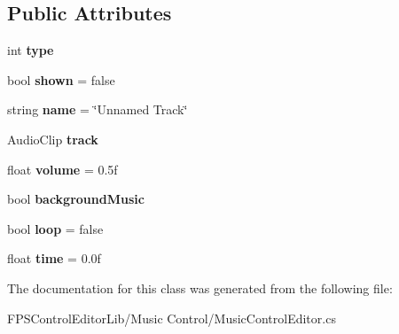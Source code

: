 \subsection*{Public Attributes}
\begin{DoxyCompactItemize}
\item 
\hypertarget{class_f_p_s_control_editor_1_1_node_af5dc9440907e8f9b055884e33a6498bb}{int {\bfseries type}}\label{class_f_p_s_control_editor_1_1_node_af5dc9440907e8f9b055884e33a6498bb}

\item 
\hypertarget{class_f_p_s_control_editor_1_1_node_a35d14bd77cfb906a119d432010929af8}{bool {\bfseries shown} = false}\label{class_f_p_s_control_editor_1_1_node_a35d14bd77cfb906a119d432010929af8}

\item 
\hypertarget{class_f_p_s_control_editor_1_1_node_ae3ea5c3b57c8b776ccd4e93af6aa18e6}{string {\bfseries name} = \char`\"{}Unnamed Track\char`\"{}}\label{class_f_p_s_control_editor_1_1_node_ae3ea5c3b57c8b776ccd4e93af6aa18e6}

\item 
\hypertarget{class_f_p_s_control_editor_1_1_node_ae22cab3f91ee42d6432e3883bf34ea52}{Audio\-Clip {\bfseries track}}\label{class_f_p_s_control_editor_1_1_node_ae22cab3f91ee42d6432e3883bf34ea52}

\item 
\hypertarget{class_f_p_s_control_editor_1_1_node_a70c7a7412244231bf2c49d4861e5c0b6}{float {\bfseries volume} = 0.\-5f}\label{class_f_p_s_control_editor_1_1_node_a70c7a7412244231bf2c49d4861e5c0b6}

\item 
\hypertarget{class_f_p_s_control_editor_1_1_node_a6c07ce33441965ffeee8945746b519d6}{bool {\bfseries background\-Music}}\label{class_f_p_s_control_editor_1_1_node_a6c07ce33441965ffeee8945746b519d6}

\item 
\hypertarget{class_f_p_s_control_editor_1_1_node_ad07e8306842d5b66207ed27b2766f331}{bool {\bfseries loop} = false}\label{class_f_p_s_control_editor_1_1_node_ad07e8306842d5b66207ed27b2766f331}

\item 
\hypertarget{class_f_p_s_control_editor_1_1_node_acd5b24eee53950110e4633afcaa977a0}{float {\bfseries time} = 0.\-0f}\label{class_f_p_s_control_editor_1_1_node_acd5b24eee53950110e4633afcaa977a0}

\end{DoxyCompactItemize}


The documentation for this class was generated from the following file\-:\begin{DoxyCompactItemize}
\item 
F\-P\-S\-Control\-Editor\-Lib/\-Music Control/Music\-Control\-Editor.\-cs\end{DoxyCompactItemize}
